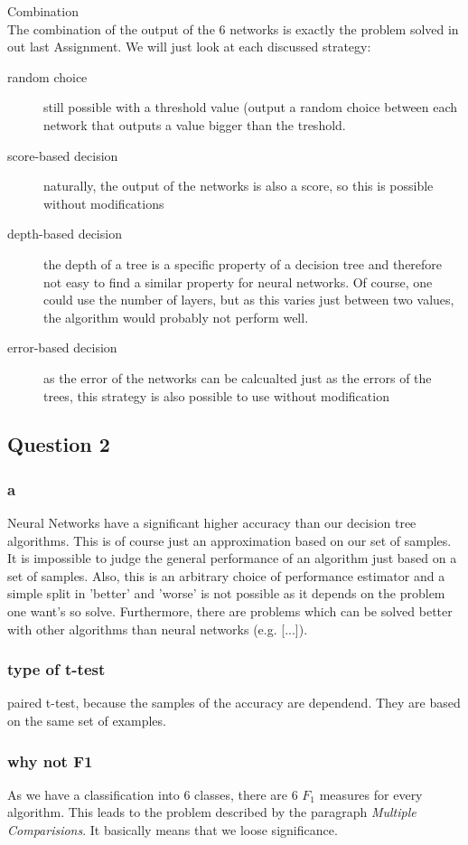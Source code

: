 \documentclass{article}
\begin{document}
Combination\\
The combination of the output of the 6 networks is exactly the problem solved in out last Assignment. We will just look at each discussed strategy:
\begin{description}
    \item[random choice] still possible with a threshold value (output a random choice between each network that outputs a value bigger than the treshold.
    \item[score-based decision] naturally, the output of the networks is also a score, so this is possible without modifications
    \item[depth-based decision] the depth of a tree is a specific property of a decision tree and therefore not easy to find a similar property for neural networks. Of course, one could use the number of layers, but as this varies just between two values, the algorithm would probably not perform well.
    \item[error-based decision] as the error of the networks can be calcualted just as the errors of the trees, this strategy is also possible to use without modification
\end{description}

\subsection{Question 2}
\subsubsection{a}
Neural Networks have a significant higher accuracy than our decision tree algorithms. This is of course just an approximation based on our set of samples. It is impossible to judge the general performance of an algorithm just based on a set of samples. Also, this is an arbitrary choice of performance estimator and a simple split in 'better' and 'worse' is not possible as it depends on the problem one want's so solve.
Furthermore, there are problems which can be solved better with other algorithms than neural networks (e.g.  [...]).

\subsubsection{type of t-test}
paired t-test, because the samples of the accuracy are dependend. They are based on the same set of examples.
\subsubsection{why not F1}
As we have a classification into 6 classes, there are 6 $F_1$ measures for every algorithm. This leads to the problem described by the paragraph \emph{Multiple Comparisions}. It basically means that we loose significance.
\end{document}

